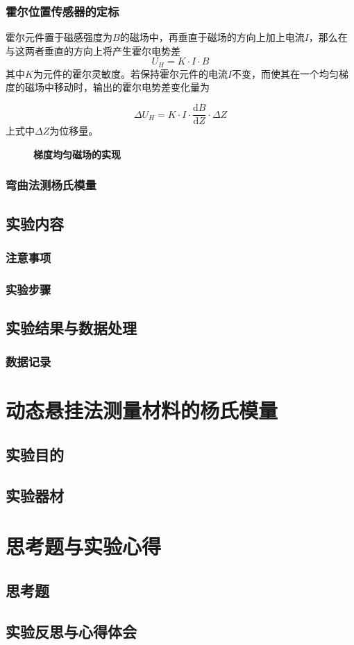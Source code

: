 \documentclass[zihao=5, UTF8]{article}
\theoremstyle{MyLineTheoremStyle} %
\theoremstyle{MyBlockTheoremStyle} %
\theoremstyle{MySubsubsectionStyle} %
\begin{document}
\subsubsection{霍尔位置传感器的定标}

霍尔元件置于磁感强度为$ B $的磁场中，再垂直于磁场的方向上加上电流$ I $，那么在与这两者垂直的方向上将产生霍尔电势差
\begin{equation}
    U_H=K\cdot I\cdot B
\end{equation}
其中$ K $为元件的霍尔灵敏度。若保持霍尔元件的电流$ I $不变，而使其在一个均匀梯度的磁场中移动时，输出的霍尔电势差变化量为

\begin{equation}
    \Delta U_H=K\cdot I\cdot\frac{\mathrm{d} B}{\mathrm{d} Z}\cdot\Delta Z
\end{equation}
上式中$ \Delta Z $为位移量。

\begin{figure}[H]
    \centering
    
    \caption{\textbf{梯度均匀磁场的实现}}\label{梯度均匀磁场的实现}
\end{figure}

\subsubsection{弯曲法测杨氏模量}

\subsection{实验内容}
\subsubsection{注意事项}
\subsubsection{实验步骤}
\subsection{实验结果与数据处理}
\subsubsection{数据记录}

\newpage
\section{动态悬挂法测量材料的杨氏模量}
\subsection{实验目的}
\subsection{实验器材}

\newpage
\section{思考题与实验心得}
\subsection{思考题}
\subsection{实验反思与心得体会}
\end{document}
